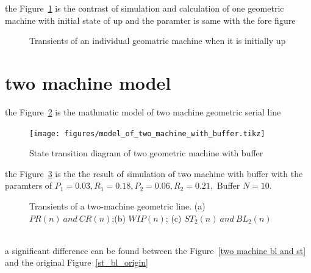 the Figure~\ref{Transients of an individual geomatric machine when it is initially up} is the contrast of simulation and calculation of one geometric machine with initial state of up and the paramter is same with the fore figure

\begin{figure}[!h]
	\centering
	\caption{Transients of an individual geomatric machine when it is initially up}
	\label{Transients of an individual geomatric machine when it is initially up}
\end{figure}

\section{two machine model}
\noindent the Figure~\ref{State transition diagram of two geometric machine with buffer} is the mathmatic model of two machine geometric serial line 
\begin{figure}[!h]
	\centering
	\texttt{[image: figures/model\_of\_two\_machine\_with\_buffer.tikz]}
	\caption{State transition diagram of two geometric machine with buffer}
	\label{State transition diagram of two geometric machine with buffer}
\end{figure}

the Figure~\ref{Transients of a two-machine geometric line} is the the result of simulation of two machine with buffer with the paramters of $P_1 = 0.03, R_1 = 0.18, P_2 = 0.06, R_2 = 0.21,$ Buffer $ N = 10$.

\begin{figure}[!h]
	\centering
	\caption{Transients of a two-machine geometric line. (a) $PR(n)\ and\ CR(n)$;(b) $WIP(n)$; (c) $ST_2(n)\ and\ BL_2(n)$}
	\label{Transients of a two-machine geometric line}
\end{figure}
~\\
a significant difference can be found between the Figure~\ref{two machine bl and st} and the original Figure~\ref{st_bl_origin}


